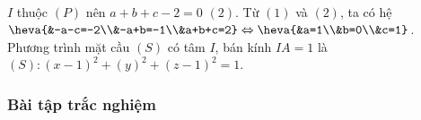 \begin{vd}
{\begin{enumerate}
			\\$I$ thuộc $\left( {P} \right)$ nên $a+b+c-2=0$ $\left( {2} \right)$. Từ $\left( {1} \right)$ và $\left( {2} \right)$, ta có hệ $\heva{&-a-c=-2\\&-a+b=-1\\&a+b+c=2} \Leftrightarrow \heva{&a=1\\&b=0\\&c=1}$.
			\\Phương trình mặt cầu $\left( {S} \right)$ có tâm $I$, bán kính $IA=1$ là $(S) \colon \left( {x-1} \right)^2+\left( {y} \right)^2+\left( {z-1} \right)^2=1$.
				\end{enumerate}
	}
\end{vd}
\subsubsection{Bài tập trắc nghiệm}

